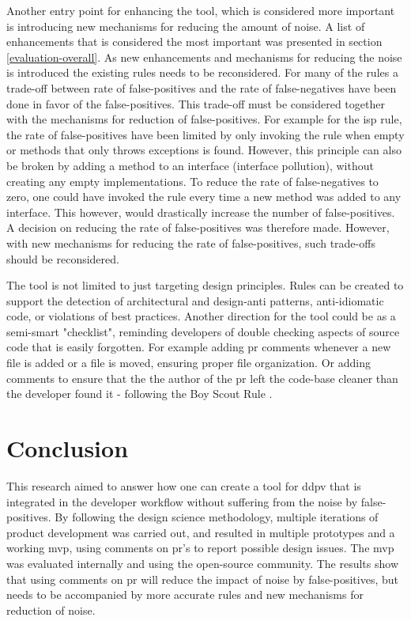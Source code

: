 \documentclass{report}
\begin{document}
Another entry point for enhancing the tool, which is considered more important is introducing new mechanisms for reducing the amount of noise. A list of enhancements that is considered the most important was presented in section \ref{evaluation-overall}. As new enhancements and mechanisms for reducing the noise is introduced the existing rules needs to be reconsidered. For many of the rules a trade-off between rate of false-positives and the rate of false-negatives have been done in favor of the false-positives. This trade-off must be considered together with the mechanisms for reduction of false-positives. For example for the \gls{isp} rule, the rate of false-positives have been limited by only invoking the rule when empty or methods that only throws exceptions is found. However, this principle can also be broken by adding a method to an interface (interface pollution), without creating any empty implementations. To reduce the rate of false-negatives to zero, one could have invoked the rule every time a new method was added to any interface. This however, would drastically increase the number of false-positives. A decision on reducing the rate of false-positives was therefore made. However, with new mechanisms for reducing the rate of false-positives, such trade-offs should be reconsidered. 

The tool is not limited to just targeting design principles. Rules can be created to support the detection of architectural and design-anti patterns, anti-idiomatic code, or violations of best practices. Another direction for the tool could be as a semi-smart "checklist", reminding developers of double checking aspects of source code that is easily forgotten. For example adding \gls{pr} comments whenever a new file is added or a file is moved, ensuring proper file organization. Or adding comments to ensure that the the author of the \gls{pr} left the code-base cleaner than the developer found it - following the Boy Scout Rule \cite{boy-scout}.

\section{Conclusion}
\label{conclusion}


This research aimed to answer how one can create a tool for \gls{ddpv} that is integrated in the developer workflow without suffering from the noise by false-positives. By following the design science methodology, multiple iterations of product development was carried out, and resulted in multiple prototypes and a working \gls{mvp}, using comments on \gls{pr}'s to report possible design issues. The \gls{mvp} was evaluated internally and using the open-source community. The results show that using comments on \gls{pr} will reduce the impact of noise by false-positives, but needs to be accompanied by more accurate rules and new mechanisms for reduction of noise. 
\end{document}
